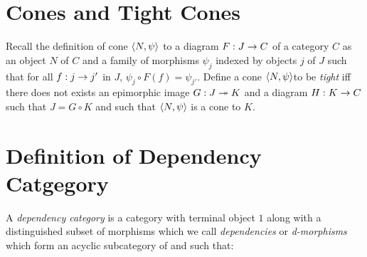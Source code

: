 \documentclass[10pt,a4paper]{article}
\begin{document}
\section{Cones and Tight Cones}
Recall the definition of cone $\left\langle N,\psi\right\rangle$ to a diagram $F:J \rightarrow C$ of a category $C$ as an object $N$ of $C$ and a family of morphisms $\psi_j$ indexed by objects $j$ of $J$ such that for all $f: j \rightarrow j'$ in $J$, $\psi_j \circ F(f) = \psi_{j'}$. Define a cone $\left\langle N,\psi\right\rangle$to be \textit{tight} iff there does not exists an epimorphic image $G: J \twoheadrightarrow K$ and a diagram $H:K \rightarrow C$ such that $J=G \circ K$ and such that $\left\langle N,\psi\right\rangle$ is a cone to $K$.

\section{Definition of Dependency Catgegory}
A \textit{dependency category} is a category  with terminal object $1$ along with a distinguished subset of morphisms which we call \textit{dependencies} or \textit{d-morphisms} which form an acyclic subcategory of  and such that:
\end{document}
